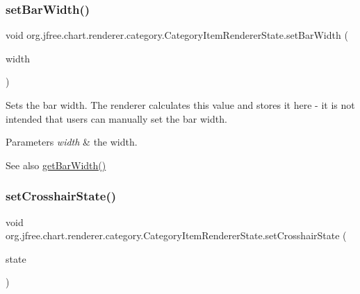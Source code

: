 \subsubsection{\texorpdfstring{set\+Bar\+Width()}{setBarWidth()}}
{\footnotesize\ttfamily void org.\+jfree.\+chart.\+renderer.\+category.\+Category\+Item\+Renderer\+State.\+set\+Bar\+Width (\begin{DoxyParamCaption}\item[{double}]{width }\end{DoxyParamCaption})}

Sets the bar width. The renderer calculates this value and stores it here -\/ it is not intended that users can manually set the bar width.


\begin{DoxyParams}{Parameters}
{\em width} & the width.\\
\hline
\end{DoxyParams}
\begin{DoxySeeAlso}{See also}
\mbox{\hyperlink{classorg_1_1jfree_1_1chart_1_1renderer_1_1category_1_1_category_item_renderer_state_a8c9ac59a1be97bd9528e30cee6d60f09}{get\+Bar\+Width()}} 
\end{DoxySeeAlso}
\mbox{\label{classorg_1_1jfree_1_1chart_1_1renderer_1_1category_1_1_category_item_renderer_state_aca8f9ffa3ab8ed01189ca4c654761adc}} 
\subsubsection{\texorpdfstring{set\+Crosshair\+State()}{setCrosshairState()}}
{\footnotesize\ttfamily void org.\+jfree.\+chart.\+renderer.\+category.\+Category\+Item\+Renderer\+State.\+set\+Crosshair\+State (\begin{DoxyParamCaption}\item[{\mbox{\hyperlink{classorg_1_1jfree_1_1chart_1_1plot_1_1_category_crosshair_state}{Category\+Crosshair\+State}}}]{state }\end{DoxyParamCaption})}

